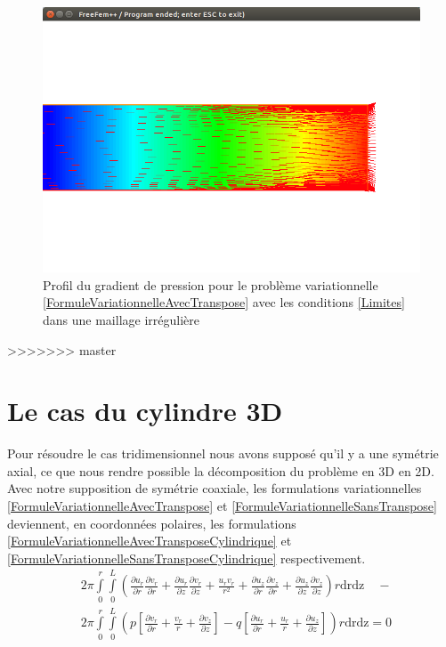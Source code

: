 \documentclass[11pt,a4paper]{article}
\numberwithin{equation}{subsection}
\numberwithin{figure}{subsection}
\begin{document}
\begin{figure}[h]
\centering
\includegraphics[scale=0.4]{StokesLimitesTransposePressionIrregulier.png}
\caption{Profil du gradient de pression pour le problème variationnelle \ref{FormuleVariationnelleAvecTranspose} avec les conditions \ref{Limites} dans une maillage irrégulière}
\label{StokesLimitesTransposePressionIrregulier}
\end{figure}
>>>>>>> master

%
%
\section{Le cas du cylindre 3D}

Pour résoudre le cas tridimensionnel nous avons supposé qu'il y a une symétrie axial, ce que nous rendre possible la décomposition du problème en 3D en 2D. Avec notre supposition de symétrie coaxiale, les formulations variationnelles \ref{FormuleVariationnelleAvecTranspose} et \ref{FormuleVariationnelleSansTranspose} deviennent, en coordonnées polaires, les formulations \ref{FormuleVariationnelleAvecTransposeCylindrique} et \ref{FormuleVariationnelleSansTransposeCylindrique} respectivement.
\begin{equation}
\begin{aligned}
& 2\pi\int\limits_0^r\int\limits_0^L \left(\frac{\partial u_r}{\partial r}\frac{\partial v_r}{\partial r} + \frac{\partial u_r}{\partial z}\frac{\partial v_r}{\partial z} + \frac{u_rv_r}{r^2} + \frac{\partial u_z}{\partial r}\frac{\partial v_z}{\partial r} + \frac{\partial u_z}{\partial z}\frac{\partial v_z}{\partial z}\right)r\mathrm{drdz}  \quad- \\
& 2\pi\int\limits_0^r\int\limits_0^L \left(p\left[\frac{\partial v_r}{\partial r} + \frac{v_r}{r} + \frac{\partial v_z}{\partial z}\right] - q\left[\frac{\partial u_r}{\partial r} + \frac{u_r}{r} + \frac{\partial u_z}{\partial z}\right]\right) r\mathrm{drdz} = 0
\end{aligned} \label{FormuleVariationnelleSansTransposeCylindrique}
\end{equation}
\end{document}
